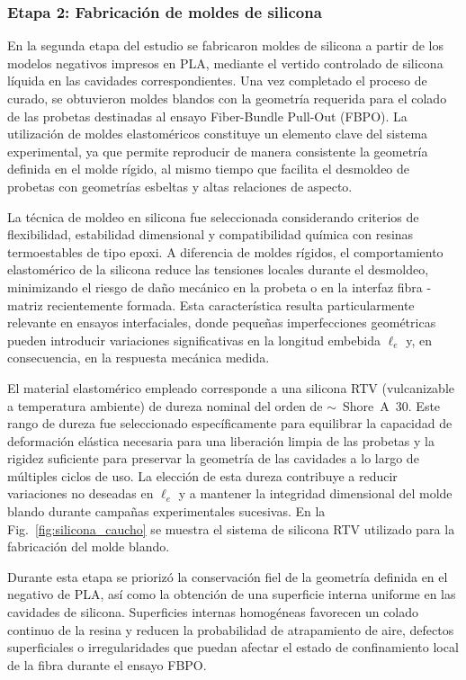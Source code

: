 \subsubsection{Etapa 2: Fabricación de moldes de silicona}

En la segunda etapa del estudio se fabricaron moldes de silicona a partir de los modelos
negativos impresos en PLA, mediante el vertido controlado de silicona líquida en las cavidades
correspondientes. Una vez completado el proceso de curado, se obtuvieron moldes blandos con la
geometría requerida para el colado de las probetas destinadas al ensayo Fiber-Bundle Pull-Out
(FBPO). La utilización de moldes elastoméricos constituye un elemento clave del sistema
experimental, ya que permite reproducir de manera consistente la geometría definida en el
molde rígido, al mismo tiempo que facilita el desmoldeo de probetas con geometrías esbeltas y
altas relaciones de aspecto.

La técnica de moldeo en silicona fue seleccionada considerando criterios de flexibilidad,
estabilidad dimensional y compatibilidad química con resinas termoestables de tipo epoxi.
A diferencia de moldes rígidos, el comportamiento elastomérico de la silicona reduce las
tensiones locales durante el desmoldeo, minimizando el riesgo de daño mecánico en la probeta o
en la interfaz fibra - matriz recientemente formada. Esta característica resulta particularmente
relevante en ensayos interfaciales, donde pequeñas imperfecciones geométricas pueden introducir
variaciones significativas en la longitud embebida \(\ell_e\) y, en consecuencia, en la
respuesta mecánica medida.

El material elastomérico empleado corresponde a una silicona RTV (vulcanizable a temperatura
ambiente) de dureza nominal del orden de \(\sim\)~Shore~A~30. Este rango de dureza fue
seleccionado específicamente para equilibrar la capacidad de deformación elástica necesaria
para una liberación limpia de las probetas y la rigidez suficiente para preservar la geometría
de las cavidades a lo largo de múltiples ciclos de uso. La elección de esta dureza contribuye a
reducir variaciones no deseadas en \(\ell_e\) y a mantener la integridad dimensional del molde
blando durante campañas experimentales sucesivas. En la Fig.~\ref{fig:silicona_caucho} se muestra
el sistema de silicona RTV utilizado para la fabricación del molde blando.

Durante esta etapa se priorizó la conservación fiel de la geometría definida en el negativo de
PLA, así como la obtención de una superficie interna uniforme en las cavidades de silicona.
Superficies internas homogéneas favorecen un colado continuo de la resina y reducen la
probabilidad de atrapamiento de aire, defectos superficiales o irregularidades que puedan
afectar el estado de confinamiento local de la fibra durante el ensayo FBPO.

